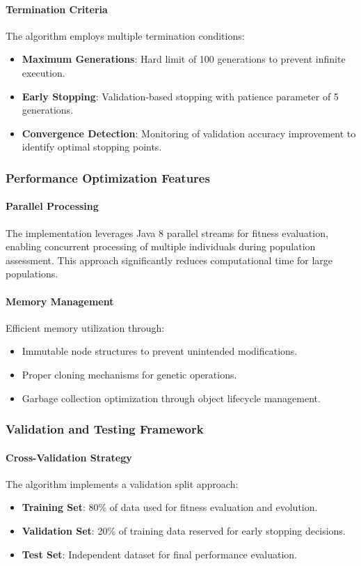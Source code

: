 \documentclass[a4paper,12pt]{article}
\begin{document}
\paragraph{Termination Criteria}
The algorithm employs multiple termination conditions:
\begin{itemize}
    \item \textbf{Maximum Generations}: Hard limit of 100 generations to prevent infinite execution.
    \item \textbf{Early Stopping}: Validation-based stopping with patience parameter of 5 generations.
    \item \textbf{Convergence Detection}: Monitoring of validation accuracy improvement to identify optimal stopping points.
\end{itemize}

\subsubsection{Performance Optimization Features}
\paragraph{Parallel Processing}
The implementation leverages Java 8 parallel streams for fitness evaluation, enabling concurrent processing of multiple individuals during population assessment. This approach significantly reduces computational time for large populations.

\paragraph{Memory Management}
Efficient memory utilization through:
\begin{itemize}
    \item Immutable node structures to prevent unintended modifications.
    \item Proper cloning mechanisms for genetic operations.
    \item Garbage collection optimization through object lifecycle management.
\end{itemize}

\subsubsection{Validation and Testing Framework}
\paragraph{Cross-Validation Strategy}
The algorithm implements a validation split approach:
\begin{itemize}
    \item \textbf{Training Set}: 80\% of data used for fitness evaluation and evolution.
    \item \textbf{Validation Set}: 20\% of training data reserved for early stopping decisions.
    \item \textbf{Test Set}: Independent dataset for final performance evaluation.
\end{itemize}
\end{document}
